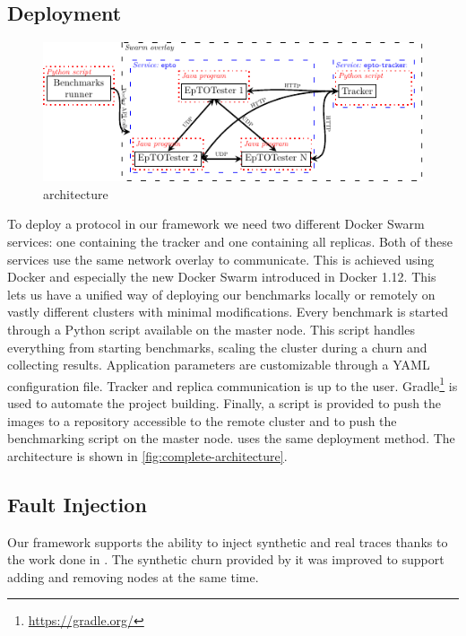 \subsection{Deployment}
 \begin{figure}[htp]
 	\centering
 	\includegraphics[width=\linewidth]{figures/complete-architecture.pdf}
 	\vspace{-2mm} 
 	\caption[Caption]{\eptotester architecture\footnotemark}
 	\vspace{-2mm} 
 	\label{fig:complete-architecture}
 \end{figure}
To deploy a protocol in our framework we need two different Docker Swarm services: one containing the tracker and one containing all replicas. Both of these services use the same network overlay to communicate. This is achieved using Docker and especially the new Docker Swarm introduced in Docker 1.12. This lets us have a unified way of deploying our benchmarks locally or remotely on vastly different clusters with minimal modifications. Every benchmark is started through a Python script available on the master node. This script handles everything from starting benchmarks, scaling the cluster during a churn and collecting results. Application parameters are customizable through a YAML configuration file. Tracker and replica communication is up to the user.
Gradle\footnote{\href{https://gradle.org/}{https://gradle.org/}} is used to automate the project building. Finally, a script is provided to push the images to a repository accessible to the remote cluster and to push the benchmarking script on the master node. \jgroups uses the same deployment method. The \eptotester architecture is shown in \autoref{fig:complete-architecture}.
\subsection{Fault Injection}
Our framework supports the ability to inject synthetic and real traces thanks to the work done in \autocite{vaucher2016erasure}. The synthetic churn provided by it was improved to support adding and removing nodes at the same time.


